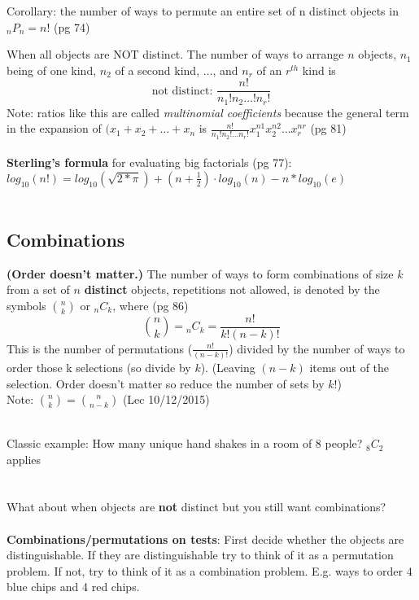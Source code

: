 Corollary: the number of ways to permute an entire set of n distinct objects in ${_n}P_n = n!$    {\tiny (pg 74) }\

When all objects are NOT distinct.  The number of ways to arrange $n$ objects, $n_1$ being of one kind, $n_2$ of a second kind, $\dots$, and $n_r$ of an $r^{th}$ kind is 
\[ \mbox{not distinct: } \frac{n!}{n{_1}!n{_2} \dots !n{_r!}} \]
Note: ratios like this are called \textit{multinomial coefficients} because the general term in the expansion of $(x_1 + x_2 + \dots + x_n$ is $\frac{n!}{n_1!n_2!\dots n_r!}x_1^{n1}x_2^{n2} \dots x_r^{nr}$  {\tiny (pg 81) }\hfill \\
\hfill \\
\textbf{Sterling's formula} for evaluating big factorials {\tiny (pg 77)}: $log_{10}(n!) = log_{10}(\sqrt{2*\pi}) + (n + \frac{1}{2}) \cdot log_{10}(n) - n*log_{10}(e)$ \hfill \\
\hfill \\

\subsection{Combinations}
\textbf{(Order doesn't matter.)} The number of ways to form combinations of size $k$ from a set of $n$ \textbf{distinct} objects, repetitions not allowed, is denoted by the symbols $\binom{n}{k}$ or ${_n}C_k$, where   {\tiny (pg 86)}
	\[ {n \choose k} = {_n}C_k = \frac{n!}{k!(n-k)!} \]
This is the number of permutations ($\frac{n!}{(n-k)!}$) divided by the number of ways to order those k selections (so divide by $k$).
(Leaving $(n-k)$ items out of the selection.  Order doesn't matter so reduce the number of sets by $k!$) \hfill \\
Note: ${n \choose k} = {n \choose n - k}$  (Lec 10/12/2015)

\hfill \\
Classic example:  How many unique hand shakes in a room of 8 people?  ${_8}C_2$ applies \hfill \\
\hfill \\
\hfill \\
What about when objects are \textbf{not} distinct but you still want combinations? \hfill \\
\hfill \\

\textbf{Combinations/permutations on tests}: First decide whether the objects are distinguishable.  If they are distinguishable try to think of it as a permutation problem.  If not, try to think of it as a combination problem.  E.g. ways to order 4 blue chips and 4 red chips.  \hfill \\
\hfill \\

